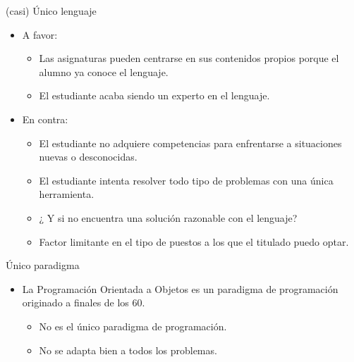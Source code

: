 \begin{frame}[t]{(casi) Único lenguaje}
  \begin{itemize}
    \item A favor:
      \begin{itemize}
        \item Las asignaturas pueden centrarse en sus contenidos propios porque el alumno ya conoce el lenguaje.
        \item El estudiante acaba siendo un experto en el lenguaje.
      \end{itemize}
    \item \pause En contra:
      \begin{itemize}
        \item El estudiante no adquiere competencias para enfrentarse a situaciones nuevas o desconocidas.
        \item El estudiante intenta resolver todo tipo de problemas con una única herramienta.
        \item ¿ Y si no encuentra una solución razonable con el lenguaje?
        \item Factor limitante en el tipo de puestos a los que el titulado puedo optar.
      \end{itemize}
  \end{itemize}
\end{frame}

\begin{frame}[t]{Único paradigma}
  \begin{itemize}
    \item La Programación Orientada a Objetos es un paradigma de programación originado a finales de los 60.
      \begin{itemize}
        \item No es el único paradigma de programación.
        \item No se adapta bien a todos los problemas.
      \end{itemize}
  \end{itemize}
\end{frame}

